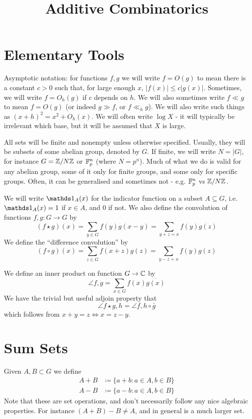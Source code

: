 \documentclass[10pt,a4paper]{article}
\title{Additive Combinatorics}
\begin{document}
\maketitle
\tableofcontents
\newpage
\section{Elementary Tools}
Asymptotic notation: for functions $f, g$ we will write $f = O(g)$ to mean there is a constant $c > 0$ such that, for large enough $x$, $|f(x)| \leq c|g(x)|$. Sometimes, we will write $f = O_h(g)$ if $c$ depends on $h$. We will also sometimes write $f \ll g$ to mean $f=O(g)$ (or indeed $g \gg f$, or $f \ll_h g$). We will also write such things as $(x+h)^2 = x^2 + O_h(x)$. We will often write $\log X$ - it will typically be irrelevant which base, but it will be assumed that $X$ is large.

All sets will be finite and nonempty unless otherwise specified. Usually, they will be subsets of some abelian group, denoted by $G$. If finite, we will write $N = |G|$, for instance $G = \mathbb{Z}/N\mathbb{Z}$ or $\mathbb{F}_p^n$ (where $N = p^n$). Much of what we do is valid for any abelian group, some of it only for finite groups, and some only for specific groups. Often, it can be generalised and sometimes not - e.g. $\mathbb{F}_p^n$ vs $\mathbb{Z}/N\mathbb{Z}$.

We will write $\one_A(x)$ for the indicator function on a subset $A \subseteq G$, i.e. $\one_A(x) = 1$ if $x \in A$, and $0$ if not. We also define the convolution of functions $f, g:G \to G$ by \[(f \star g)(x) = \sum_{y \in G}f(y)g(x-y) = \sum_{y+z=x}f(y)g(z)\]
We define the ``difference convolution'' by
\[(f \circ g)(x) = \sum_{z\in G}f(x+z)g(z) = \sum_{y-z = x}f(y)g(z)\]

We define an inner product on function $G \to \mathbb{C}$ by
\[\angle{f,g} = \sum_{x\in G}f(x)\overline{g(x)}\]
We have the trivial but useful adjoin property that
\[\angle{f\star g, h} = \angle{f, h \circ \bar{g}}\]
which follows from $x+y=z \iff x = z-y$.

\section{Sum Sets}
Given $A, B \subset G$ we define
\begin{align*}
  A+B &\coloneqq \{a+b : a \in A, b\in B\}\\
  A-B &\coloneqq \{a-b : a \in A, b\in B\}
\end{align*}
Note that these are set operations, and don't necessarily follow any nice algebraic properties. For instance $(A+B)-B \neq A$, and in general is a much larger set.
\end{document}
